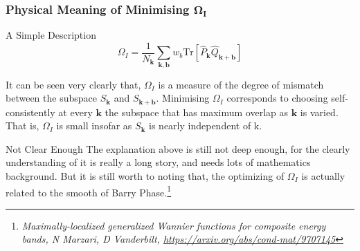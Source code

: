 \documentclass{beamer}
\begin{document}
  \begin{frame}
    \frametitle{Physical Meaning of Minimising \(\mathbf{\Omega_I}\)}

    \begin{block}{A Simple Description}
      \small
      \begin{equation*}
        \Omega_I = \dfrac{1}{N_\mathbf{k}}\sum_{\mathbf{k},\mathbf{b}}w_b{}\mathrm{Tr}\left[\widehat{P}_{\mathbf{k}}\widehat{Q}_{\mathbf{k}+\mathbf{b}} \right]
      \end{equation*}

      It can be seen very clearly that, \(\Omega_I\) is a measure of the degree of mismatch between the subspace \(S_{\mathbf{k}}\) and \(S_{\mathbf{k}+\mathbf{b}}\). {\color{purple}Minimising \(\Omega_I\) corresponds to choosing self-consistently at every \(\mathbf{k}\) the subspace that has maximum overlap as \(\mathbf{k}\) is varied.} That is, \(\Omega_I\) is small
      insofar as \(S_\mathbf{k}\) is nearly independent of k.
    \end{block}

    \begin{alertblock}{Not Clear Enough}
      \small
      The explanation above is still not deep enough, for the clearly understanding of it is really a long story, and needs lots of mathematics background. But it is still worth to noting that, the optimizing of \(\Omega_I\) is actually related to the smooth of Barry Phase.\footnote{\tiny\emph{Maximally-localized generalized Wannier functions for composite energy bands, N Marzari, D Vanderbilt, \url{https://arxiv.org/abs/cond-mat/9707145}}}
    \end{alertblock}
  \end{frame}
\end{document}
